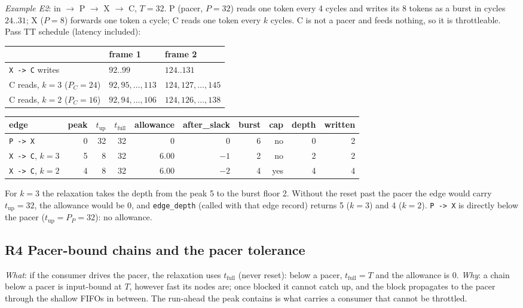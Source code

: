 \documentclass[10pt,a4paper]{article}
\newcommand{\code}[1]{\texttt{#1}}
\newcommand{\Tg}{T}           %
\begin{document}
\emph{Example E2}: in $\to$ P $\to$ X $\to$ C, $\Tg=32$. P (pacer, $P=32$) reads
one token every 4 cycles and writes its 8 tokens as a burst in cycles $24..31$;
X ($P=8$) forwards one token a cycle; C reads one token every $k$ cycles. C is not
a pacer and feeds nothing, so it is throttleable. Pass TT schedule (latency
included):
\begin{center}\small
\begin{tabular}{@{}lll@{}}
\toprule
& frame 1 & frame 2\\
\midrule
\code{X -> C} writes & $92..99$ & $124..131$\\
C reads, $k=3$ ($P_C=24$) & $92,95,\dots,113$ & $124,127,\dots,145$\\
C reads, $k=2$ ($P_C=16$) & $92,94,\dots,106$ & $124,126,\dots,138$\\
\bottomrule
\end{tabular}
\end{center}
\begin{center}\small
\begin{tabular}{@{}lrrrrrrrrr@{}}
\toprule
edge & peak & $t_{\mathrm{up}}$ & $t_{\mathrm{full}}$ & allowance & after\_slack & burst & cap & depth & written\\
\midrule
\code{P -> X} & 0 & 32 & 32 & 0 & 0 & 6 & no & 0 & 2\\
\code{X -> C}, $k=3$ & 5 & 8 & 32 & 6.00 & $-1$ & 2 & no & 2 & 2\\
\code{X -> C}, $k=2$ & 4 & 8 & 32 & 6.00 & $-2$ & 4 & yes & 4 & 4\\
\bottomrule
\end{tabular}
\end{center}
For $k=3$ the relaxation takes the depth from the peak 5 to the burst floor 2.
Without the reset past the pacer the edge would carry $t_{\mathrm{up}}=32$, the
allowance would be 0, and \code{edge\_depth} (called with that edge record) returns 5
($k=3$) and 4 ($k=2$). \code{P -> X} is directly below the pacer
($t_{\mathrm{up}}=P_P=32$): no allowance.

\subsection{R4 Pacer-bound chains and the pacer tolerance}\label{sec:pacerbound}

\emph{What}: if the consumer drives the pacer, the relaxation uses
$t_{\mathrm{full}}$ (never reset): below a pacer, $t_{\mathrm{full}}=\Tg$ and the
allowance is 0. \emph{Why}: a chain below a pacer is input-bound at $\Tg$, however
fast its nodes are; once blocked it cannot catch up, and the block propagates to
the pacer through the shallow FIFOs in between. The run-ahead the peak contains
is what carries a consumer that cannot be throttled.
\end{document}

